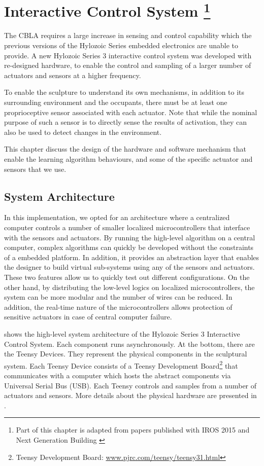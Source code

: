 \chapter[Interactive Control System]
{Interactive Control System 
	\footnote{Part of this chapter is adapted from papers published with IROS 2015 \cite{Chan2015} and Next Generation Building \cite{Gorbet2015}}} 
\label{chap:ctrl_system}

The CBLA requires a large increase in sensing and control capability which the previous versions of the Hylozoic Series embedded electronics \cite{Beesley2010} are unable to provide. A new Hylozoic Series 3 interactive control system was developed with re-designed hardware, to enable the control and sampling of a larger number of actuators and sensors at a higher frequency. 

To enable the sculpture to understand its own mechanisms, in addition to its surrounding environment and the occupants, there must be at least one proprioceptive sensor associated with each actuator. Note that while the nominal purpose of such a sensor is to directly sense the results of activation, they can also be used to detect changes in the environment.

This chapter discuss the design of the hardware and software mechanism that enable the learning algorithm behaviours, and some of the specific actuator and sensors that we use. 


\section{System Architecture}

In this implementation, we opted for an architecture where a centralized computer controls a number of smaller localized microcontrollers that interface with the sensors and actuators. By running the high-level algorithm on a central computer, complex algorithms can quickly be developed without the constraints of a embedded platform. In addition, it provides an abstraction layer that enables the designer to build virtual sub-systems using any of the sensors and actuators. These two features allow us to quickly test out different configurations. On the other hand, by distributing the low-level logics on localized microcontrollers, the system can be more modular and the number of wires can be reduced. In addition, the real-time nature of the microcontrollers allows protection of sensitive actuators in case of central computer failure. 

 shows the high-level system architecture of the Hylozoic Series 3 Interactive Control System. Each component runs asynchronously. At the bottom, there are the Teensy Devices. They represent the physical components in the sculptural system. Each Teensy Device consists of a Teensy Development Board\footnote{Teensy Development Board: \url{www.pjrc.com/teensy/teensy31.html}} that communicates with a computer which hosts the abstract components via Universal Serial Bus (USB). Each Teensy controls and samples from a number of actuators and sensors. More details about the physical hardware are presented in . 

